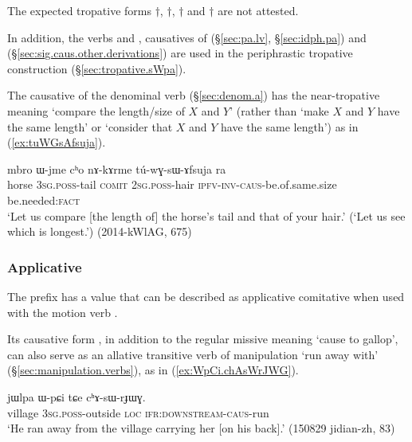  The expected tropative forms $\dagger$, $\dagger$, $\dagger$ and $\dagger$ are not attested.

In addition, the verbs  and , causatives of  (§\ref{sec:pa.lv}, §\ref{sec:idph.pa}) and  (§\ref{sec:sig.caus.other.derivations}) are used in the periphrastic tropative construction (§\ref{sec:tropative.sWpa}).

The causative of the denominal verb  (§\ref{sec:denom.a}) has the near-tropative meaning `compare the length/size of $X$ and $Y$' (rather than `make $X$ and $Y$ have the same length' or `consider that $X$ and $Y$ have the same length') as in  (\ref{ex:tuWGsAfsuja}).

\begin{exe}
\ex \label{ex:tuWGsAfsuja}
\gll mbro ɯ-jme cʰo nɤ-kɤrme tú-wɣ-sɯ-ɤfsuja ra \\
horse \textsc{3sg}.\textsc{poss}-tail \textsc{comit} \textsc{2sg}.\textsc{poss}-hair \textsc{ipfv}-\textsc{inv}-\textsc{caus}-be.of.same.size be.needed:\textsc{fact} \\
\glt `Let us compare [the length of] the horse's tail and that of your hair.' (`Let us see which is longest.') (2014-kWlAG, 675)
\end{exe}  

\subsubsection{Applicative} \label{sec:sig.caus.appl.comitative}
The  prefix has a value that can be described as applicative comitative when used with the motion verb . 

Its causative form , in addition to the regular missive meaning `cause to gallop', can also serve as an allative transitive verb of manipulation `run away with' (§\ref{sec:manipulation.verbs}), as in (\ref{ex:WpCi.chAsWrJWG}).

\begin{exe}
	\ex \label{ex:WpCi.chAsWrJWG}
	\gll jɯlpa ɯ-pɕi tɕe cʰɤ-sɯ-rɟɯɣ.  \\
	village \textsc{3sg}.\textsc{poss}-outside \textsc{loc} \textsc{ifr}:\textsc{downstream}-\textsc{caus}-run \\
	\glt `He ran away from the village carrying her [on his back].' (150829 jidian-zh, 83)
\end{exe}
 

